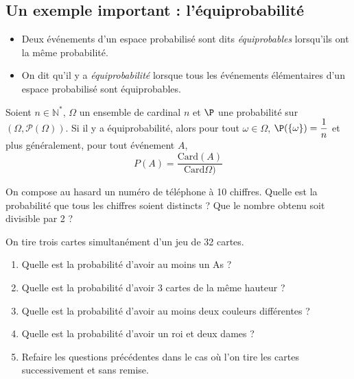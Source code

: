 \documentclass[a4paper,10pt]{report}
\begin{document}
\begin{itemize}
\subsection{Un exemple important : l'équiprobabilité}

\begin{Definition}{}
 \begin{itemize}
 \item Deux événements d'un espace probabilisé sont dits \emph{équiprobables} lorsqu'ils ont la même probabilité.
\item On dit qu'il y a \emph{équiprobabilité} lorsque tous les événements élémentaires d'un espace probabilisé sont équiprobables.
 \end{itemize}
\end{Definition}
\begin{Theoreme}{}
 Soient $n \in \mathbb{N}^*$, $\Omega$ un ensemble de cardinal $n$ et $\P$ une probabilité sur $(\Omega,\mathcal{P}(\Omega))$. Si il y a équiprobabilité, alors pour tout $\omega \in \Omega$,
$ \P(\{\omega\}) = \dfrac 1n$ et plus généralement, pour tout événement $A$, 
$$P(A) = \frac{\textrm{Card}(A)}{\textrm{Card}\Omega)}$$
\end{Theoreme}

\begin{Exemple} On compose au hasard un numéro de téléphone à 10 chiffres. Quelle est la probabilité que tous les chiffres soient distincts ? Que le nombre obtenu soit divisible par 2 ?

\vspace{5cm}
\end{Exemple}

\begin{ApplicationDirecte}
On tire trois cartes simultanément d'un jeu de 32 cartes.
\begin{enumerate}
 \item Quelle est la probabilité d'avoir au moins un As ?
 \item Quelle est la probabilité d'avoir 3 cartes de la même hauteur ?
 \item Quelle est la probabilité d'avoir au moins deux couleurs différentes ?
 \item Quelle est la probabilité d'avoir un roi et deux dames ?
 \item Refaire les questions précédentes dans le cas où l'on tire les cartes successivement et sans remise.
\end{enumerate}
\end{ApplicationDirecte}


\end{itemize}
\end{document}
